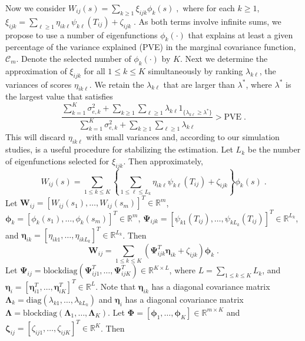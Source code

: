 \documentclass[submit]{smj}
\def\C{\mathcal{C}}
\def\C{\mathcal{C}}
\def\bPsi{\boldsymbol{\Psi}}
\def\bphi{\boldsymbol{\phi}}
\def\bPhi{\boldsymbol{\Phi}}
\def\bLambda{\boldsymbol{\Lambda}}
\def\bzeta{\boldsymbol{\zeta}}
\def\beeta{\boldsymbol{\eta}}
\begin{document}
Now we consider  $W_{ij}(s) = \sum_{k\geq 1} \xi_{ijk}\phi_k(s)\;,$
where for each $k\geq 1$, $\xi_{ijk} = \sum_{\ell\geq 1} \eta_{ik\ell} \psi_{k\ell}(T_{ij}) + \zeta_{ijk}\;.$ As both terms involve infinite sums, we propose to use a number of eigenfunctions $\phi_k(\cdot)$ that explains at least a given percentage of the variance explained (PVE) in the marginal covariance function, $\C_m$. Denote the selected number of $\phi_k(\cdot)$ by $K$. Next we determine the approximation of $\xi_{ijk}$ for all $1\leq k\leq K$ simultaneously by ranking $\lambda_{k\ell}$, the variances of scores $\eta_{ik\ell}$.
We retain the $\lambda_{k\ell}$ that are larger than $\lambda^{\ast}$, where $\lambda^{\ast}$ is the largest value that satisfies 
\begin{equation*}
	\frac{\sum_{k=1}^K\sigma^2_{e,k} + \sum_{k\geq 1}\sum_{\ell\geq 1} \lambda_{k\ell} 1_{\{\lambda_{k\ell}\geq \lambda^{\ast}\}} }{\sum_{k=1}^K\sigma^2_{e,k} + \sum_{k\geq 1}\sum_{\ell\geq 1}\lambda_{k\ell} }  > \text{PVE}\;.
\end{equation*}
This will discard $\eta_{ik\ell}$ with small variances and, according to our simulation studies, is a useful procedure for stabilizing the estimation. Let $L_k$ be the number of eigenfunctions selected for $\xi_{ijk}$. Then approximately,
\begin{equation*}
W_{ij}(s) = \sum_{1\leq k\leq K}\left\{ \sum_{1\leq \ell\leq L_k} \eta_{ik\ell} \psi_{k\ell}(T_{ij}) + \zeta_{ijk} \right\}\phi_k(s)\;.
\end{equation*}
Let $\boldsymbol{W}_{ij} = [W_{ij}(s_1),\ldots, W_{ij}(s_m)]^{T}\in\mathbb{R}^{m}$, $\bphi_{k} = [\phi_{k}(s_1),\ldots, \phi_{k}(s_m)]^{T}\in\mathbb{R}^{m}$,
$\bPsi_{ijk} = [\psi_{k1}(T_{ij}),\ldots, \psi_{kL_k}(T_{ij})]^{T}\in \mathbb{R}^{L_k}$, and 
$\beeta_{ik} = [\eta_{ik1},\ldots, \eta_{ikL_k}]^{T}\in\mathbb{R}^{L_k}$. Then
\begin{equation*}
\boldsymbol{W}_{ij} = \sum_{1\leq k\leq K}\left( \bPsi_{ijk}^{T}\beeta_{ik}+ 
\zeta_{ijk}\right)\bphi_k\;.
\end{equation*}
Let $\bPsi_{ij} = \text{blockdiag}(\bPsi_{ij1}^{T},\ldots, \bPsi_{ijK}^{T})\in \mathbb{R}^{K\times L}$, where $L = \sum_{1\leq k\leq K} L_k$, and $\beeta_i = [\beeta_{i1}^{T},\ldots, \beeta_{iK}^{T}]^{T}\in\mathbb{R}^{L}$. Note that $\beeta_{ik}$ has a diagonal covariance matrix $\bLambda_k = \text{diag}(\lambda_{k1},\ldots, \lambda_{kL_k})$ and $\beeta_i$ has a diagonal covariance matrix $\bLambda = \text{blockdiag}(\bLambda_1,\ldots, \bLambda_K)$. Let $\bPhi = [\bphi_1,\ldots, \bphi_K]\in \mathbb{R}^{m\times K}$ and $\bzeta_{ij} = [\zeta_{ij1},\ldots, \zeta_{ijK}]^{T} \in \mathbb{R}^{K}$. Then
\end{document}
